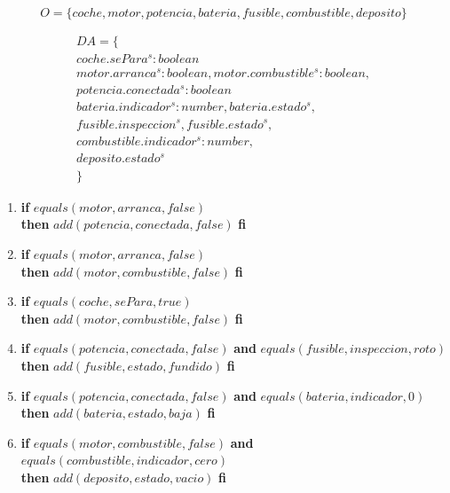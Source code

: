\documentclass[10pt, a4paper,spanish]{article}
\begin{document}
		\begin{equation*}
			O = \{coche, motor, potencia, bateria, fusible, combustible, deposito \}
		\end{equation*}

		\begin{multline*}
			DA = \{ \\
				coche.sePara^s:boolean \\
				motor.arranca^s:boolean, motor.combustible^s:boolean, \\
				potencia.conectada^s:boolean \\
				bateria.indicador^s:number, bateria.estado^s,\\
				fusible.inspeccion^s, fusible.estado^s, \\
				combustible.indicador^s:number, \\
				deposito.estado^s \\
			\}
		\end{multline*}


		\begin{enumerate}[label={\textbf{R\theenumi:}}]

			\item
				\textbf{if} $equals(motor, arranca, false)$ \\
				\textbf{then} $add(potencia, conectada, false)$ \textbf{fi}

			\item
				\textbf{if} $equals(motor, arranca, false)$ \\
				\textbf{then} $add(motor, combustible, false)$ \textbf{fi}

			\item
				\textbf{if} $equals(coche, sePara, true)$ \\
				\textbf{then} $add(motor, combustible, false)$ \textbf{fi}

			\item
				\textbf{if} $equals(potencia, conectada, false)$ \textbf{and} $equals(fusible, inspeccion, roto)$ \\
				\textbf{then} $add(fusible, estado, fundido)$ \textbf{fi}

			\item
				\textbf{if} $equals(potencia, conectada, false)$ \textbf{and} $equals(bateria, indicador, 0)$ \\
				\textbf{then} $add(bateria, estado, baja)$ \textbf{fi}

			\item
				\textbf{if} $equals(motor, combustible, false)$ \textbf{and} $equals(combustible, indicador, cero)$ \\
				\textbf{then} $add(deposito, estado, vacio)$ \textbf{fi}


		\end{enumerate}
\end{document}
